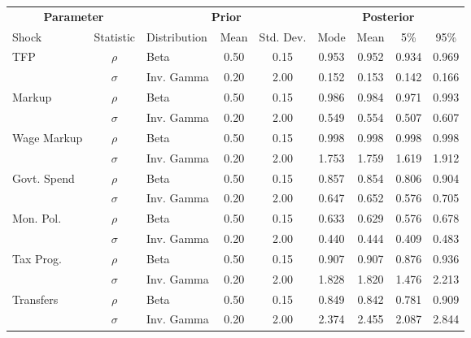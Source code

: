 \begin{tabular}{lclcccccc}
    \toprule
    \multicolumn{2}{c}{\textbf{Parameter}} & \multicolumn{3}{c}{\textbf{Prior}} & \multicolumn{4}{c}{\textbf{Posterior}} \\
    Shock & Statistic & Distribution & Mean & Std. Dev. & Mode & Mean & 5\% & 95\% \\
    \cmidrule(lr){1-2} \cmidrule(lr){3-5} \cmidrule(lr){6-9}
    \multicolumn{1}{l}{\multirow{2}{*}{TFP}} & $\rho$ & Beta & 0.50 & 0.15 & 0.953 & 0.952 & 0.934 & 0.969 \\
    & $\sigma$ & Inv. Gamma & 0.20 & 2.00 & 0.152 & 0.153 & 0.142 & 0.166 \\
    \cmidrule(lr){1-2}
    \multicolumn{1}{l}{\multirow{2}{*}{Markup}} & $\rho$ & Beta & 0.50 & 0.15 & 0.986 & 0.984 & 0.971 & 0.993 \\
    & $\sigma$ & Inv. Gamma & 0.20 & 2.00 & 0.549 & 0.554 & 0.507 & 0.607 \\
    \cmidrule(lr){1-2}
    \multicolumn{1}{l}{\multirow{2}{*}{Wage Markup}} & $\rho$ & Beta & 0.50 & 0.15 & 0.998 & 0.998 & 0.998 & 0.998 \\
    & $\sigma$ & Inv. Gamma & 0.20 & 2.00 & 1.753 & 1.759 & 1.619 & 1.912 \\
    \cmidrule(lr){1-2}
    \multicolumn{1}{l}{\multirow{2}{*}{Govt. Spend}} & $\rho$ & Beta & 0.50 & 0.15 & 0.857 & 0.854 & 0.806 & 0.904 \\
    & $\sigma$ & Inv. Gamma & 0.20 & 2.00 & 0.647 & 0.652 & 0.576 & 0.705 \\
    \cmidrule(lr){1-2}
    \multicolumn{1}{l}{\multirow{2}{*}{Mon. Pol.}} & $\rho$ & Beta & 0.50 & 0.15 & 0.633 & 0.629 & 0.576 & 0.678 \\
    & $\sigma$ & Inv. Gamma & 0.20 & 2.00 & 0.440 & 0.444 & 0.409 & 0.483 \\
    \cmidrule(lr){1-2}
    \multicolumn{1}{l}{\multirow{2}{*}{Tax Prog.}} & $\rho$ & Beta & 0.50 & 0.15 & 0.907 & 0.907 & 0.876 & 0.936 \\
    & $\sigma$ & Inv. Gamma & 0.20 & 2.00 & 1.828 & 1.820 & 1.476 & 2.213 \\
    \cmidrule(lr){1-2}
    \multicolumn{1}{l}{\multirow{2}{*}{Transfers}} & $\rho$ & Beta & 0.50 & 0.15 & 0.849 & 0.842 & 0.781 & 0.909 \\
    & $\sigma$ & Inv. Gamma & 0.20 & 2.00 & 2.374 & 2.455 & 2.087 & 2.844 \\
    \bottomrule
\end{tabular}
